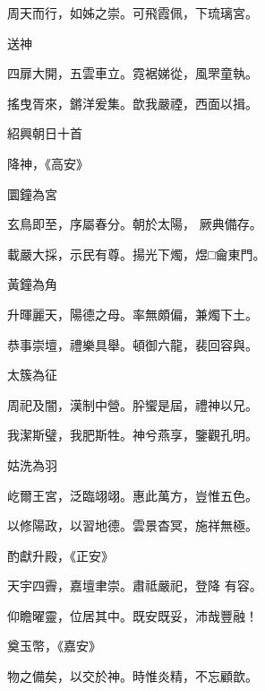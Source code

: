 \begin{pinyinscope}
 周天而行，如姊之崇。可飛霞佩，下琉璃宮。



 送神



 四扉大開，五雲車立。霓裾娣從，風罘童執。



 搖曳胥來，鏘洋爰集。歆我嚴禋，西面以揖。



 紹興朝日十首



 降神，《高安》



 圜鐘為宮



 玄鳥即至，序屬春分。朝於太陽，
 厥典備存。



 載嚴大採，示民有尊。揚光下燭，煜□龠東門。



 黃鐘為角



 升暉麗天，陽德之母。率無頗偏，兼燭下土。



 恭事崇壇，禮樂具舉。頓御六龍，裴回容與。



 太簇為征



 周祀及闇，漢制中營。肸蠁是屆，禮神以兄。



 我潔斯璧，我肥斯牲。神兮燕享，鑒觀孔明。



 姑洗為羽



 屹爾王宮，泛臨翊翊。惠此萬方，豈惟五色。



 以修陽政，以習地德。雲景杳冥，施祥無極。



 酌獻升殿，《正安》



 天宇四霽，嘉壇聿崇。肅祗嚴祀，登降
 有容。



 仰瞻曜靈，位居其中。既安既妥，沛哉豐融！



 奠玉幣，《嘉安》



 物之備矣，以交於神。時惟炎精，不忘顧歆。




\end{pinyinscope}
